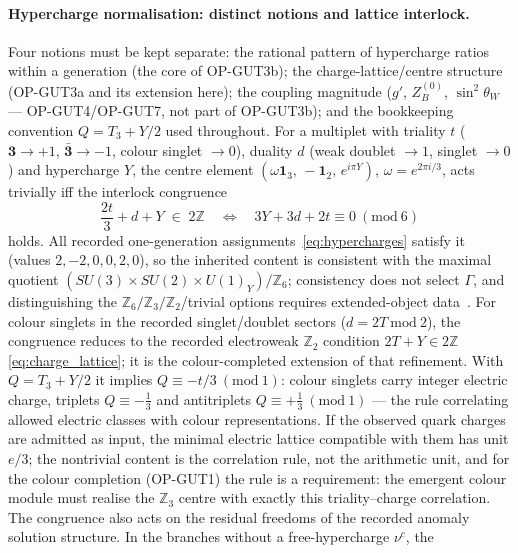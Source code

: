 \paragraph{Hypercharge normalisation: distinct notions and
lattice interlock.}
Four notions must be kept separate: the rational pattern of
hypercharge ratios within a generation (the core of OP-GUT3b);
the charge-lattice/centre structure (OP-GUT3a and its extension
here); the coupling magnitude ($g'$, $Z_B^{(0)}$,
$\sin^2\theta_W$ --- OP-GUT4/OP-GUT7, not part of OP-GUT3b); and
the bookkeeping convention $Q=T_3+Y/2$ used throughout.
For a multiplet with triality $t$ ($\mathbf3\to+1$,
$\bar{\mathbf3}\to-1$, colour singlet $\to0$), duality $d$ (weak
doublet $\to1$, singlet $\to0$) and hypercharge $Y$, the centre
element $(\omega\mathbf 1_3,\,-\mathbf 1_2,\,e^{i\pi Y})$,
$\omega=e^{2\pi i/3}$, acts trivially iff the interlock
congruence
\begin{equation}
  \frac{2t}{3}+d+Y\;\in\;2\mathbb Z
  \quad\Longleftrightarrow\quad
  3Y+3d+2t\equiv0\ (\mathrm{mod}\ 6)
  \label{eq:interlock_congruence}
\end{equation}
holds.
All recorded one-generation assignments~\eqref{eq:hypercharges}
satisfy it (values $2,-2,0,0,2,0$), so the inherited content is
consistent with the maximal quotient
$(SU(3)\times SU(2)\times U(1)_Y)/\mathbb Z_6$; consistency does
not select $\Gamma$, and distinguishing the
$\mathbb Z_6/\mathbb Z_3/\mathbb Z_2$/trivial options requires
extended-object data~\cite{AharonyEtAl2013}.
For colour singlets in the recorded singlet/doublet sectors
($d=2T\ \mathrm{mod}\ 2$), the congruence reduces to the recorded
electroweak $\mathbb Z_2$ condition $2T+Y\in2\mathbb Z$
\eqref{eq:charge_lattice}; it is the colour-completed extension
of that refinement.
With $Q=T_3+Y/2$ it implies $Q\equiv-t/3\ (\mathrm{mod}\ 1)$:
colour singlets carry integer electric charge, triplets
$Q\equiv-\tfrac13$ and antitriplets
$Q\equiv+\tfrac13\ (\mathrm{mod}\ 1)$ --- the rule correlating
allowed electric classes with colour representations.
If the observed quark charges are admitted as input, the minimal
electric lattice compatible with them has unit $e/3$; the
nontrivial content is the correlation rule, not the arithmetic
unit, and for the colour completion (OP-GUT1) the rule is a
requirement: the emergent colour module must realise the
$\mathbb Z_3$ centre with exactly this triality--charge
correlation.
The congruence also acts on the residual freedoms of the
recorded anomaly solution structure.
In the branches without a free-hypercharge $\nu^c$, the
